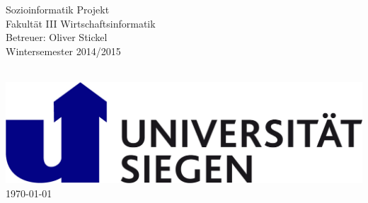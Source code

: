 \documentclass[a4paper,12pt]{scrartcl}
\begin{document}
\renewcommand{\sectionmark}[1]{\markright{#1}}
\renewcommand{\leftmark}{\rightmark}
\pagestyle{fancy}
\lhead{}
\chead{}
\rhead{\thesection\space\contentsname}
\renewcommand{\headrulewidth}{0.4pt}

\renewcommand{\thesection}{\Roman{section}}
\renewcommand{\thesection}{\Roman{section}}



\begin{titlepage}


\begin{minipage}[t]{0.76\textwidth}
\begin{flushleft}
\begin{small}

Sozioinformatik Projekt\\
Fakultät III Wirtschaftsinformatik \\
Betreuer: Oliver Stickel\\
Wintersemester 2014/2015\\

\end{small}
\end{flushleft}
\end{minipage}
\begin{minipage}[t]{0.24\textwidth}
\begin{flushleft}
\ \\
\includegraphics[scale=0.07]{logo.jpg}\\
\today
\end{flushleft}
\end{minipage}


\end{titlepage}
\end{document}
